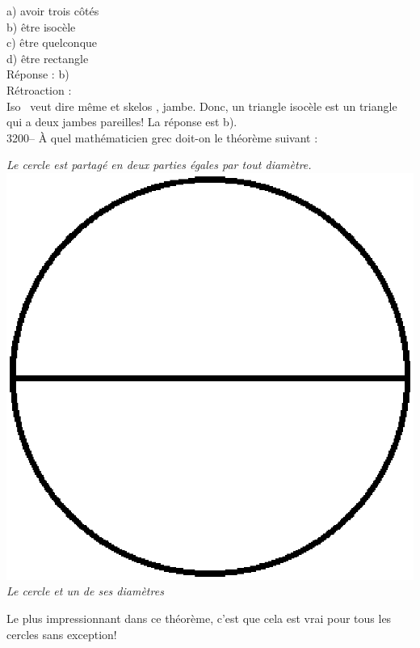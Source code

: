 \documentclass[letterpaper, 12pt]{article}
\begin{document}
a) avoir trois c\^ot\'es\\
b) \^etre isoc\`ele\\
c) \^etre quelconque\\
d) \^etre rectangle\\

R\'eponse : b)\\

R\'etroaction :\\
\og Iso \fg \ veut dire m\^eme et \og skelos \fg, jambe. Donc, un triangle isoc\`ele est un triangle qui a deux jambes pareilles! La r\'eponse est b).\\



3200-- \`A quel math\'ematicien grec doit-on le th\'eor\`eme suivant :
\begin{center}
\emph{Le cercle est partag\'e en deux parties \'egales par tout diam\`etre.}\\
\includegraphics[scale=0.35]{diametre.eps}\\
\emph{\small{Le cercle et un de ses diam\`etres}}\\
\end{center}
Le plus impressionnant dans ce th\'eor\`eme, c'est que cela est vrai pour tous les cercles sans exception!\\
\end{document}
